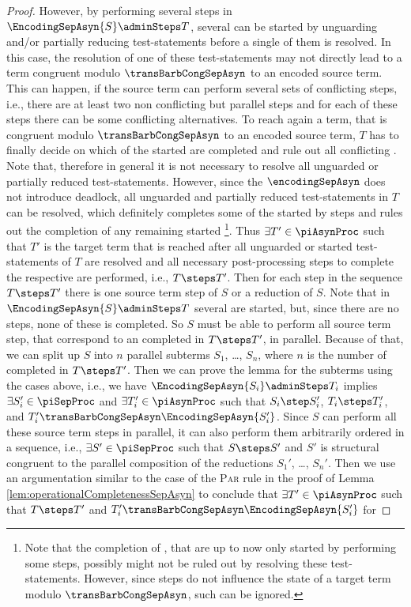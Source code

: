 \documentclass[]{llncs}
\begin{document}
\begin{proof}
	However, by performing several \impure \admin steps in $ \EncodingSepAsyn{S} \adminSteps T $, several \simulations can be started by unguarding and/or partially reducing test-statements before a single of them is resolved. In this case, the resolution of one of these test-statements may not directly lead to a term congruent modulo $ \transBarbCongSepAsyn $ to an encoded source term. This can happen, if the source term can perform several sets of conflicting steps, i.e., there are at least two non conflicting but parallel steps and for each of these steps there can be some conflicting alternatives. To reach again a term, that is congruent modulo $ \transBarbCongSepAsyn $ to an encoded source term, $ T $ has to finally decide on which of the started \simulations are completed and rule out all conflicting \simulations. Note that, therefore in general it is not necessary to resolve all unguarded or partially reduced test-statements. However, since the $ \encodingSepAsyn $ does not introduce deadlock, all unguarded and partially reduced test-statements in $ T $ can be resolved, which definitely completes some of the started \simulations by \nonAdmin steps and rules out the completion of any remaining started \simulation\footnote{Note that the completion of \simulations, that are up to now only started by performing some \pure \admin steps, possibly might not be ruled out by resolving these test-statements. However, since \pure \admin steps do not influence the state of a target term modulo $ \transBarbCongSepAsyn $, such \simulations can be ignored.}. Thus $ \exists T' \in \piAsynProc $ such that $ T' $ is the target term that is reached after all unguarded or started test-statements of $ T $ are resolved and all necessary post-processing steps to complete the respective \simulations are performed, i.e., $ T \steps T' $. Then for each \nonAdmin step in the sequence $ T \steps T' $ there is one source term step of $ S $ or a reduction of $ S $. Note that in $ \EncodingSepAsyn{S} \adminSteps T $ several \simulations are started, but, since there are no \nonAdmin steps, none of these \simulations is completed. So $ S $ must be able to perform all source term step, that correspond to an \simulation completed in $ T \steps T' $, in parallel. Because of that, we can split up $ S $ into $ n $ parallel subterms $ S_1 $, \ldots, $ S_n $, where $ n $ is the number of \simulations completed in $ T \steps T' $. Then we can prove the lemma for the subterms using the cases above, i.e., we have $ \EncodingSepAsyn{S_i} \adminSteps T_i $ implies $ \exists S_i' \in \piSepProc $ and $ \exists T_i' \in \piAsynProc $ such that $ S_i \step S_i' $, $ T_i \steps T_i' $, and $ T_i' \transBarbCongSepAsyn \EncodingSepAsyn{S_i'} $. Since $ S $ can perform all these source term steps in parallel, it can also perform them arbitrarily ordered in a sequence, i.e., $ \exists S' \in \piSepProc $ such that $ S \steps S' $ and $ S' $ is structural congruent to the parallel composition of the reductions $ S_1' $, \ldots, $ S_n' $. Then we use an argumentation similar to the case of the \textsc{Par} rule in the proof of Lemma \ref{lem:operationalCompletenessSepAsyn} to conclude that $ \exists T' \in \piAsynProc $ such that $ T \steps T' $ and $ T_i' \transBarbCongSepAsyn \EncodingSepAsyn{S_i'} $ for 
\end{proof}
\end{document}

